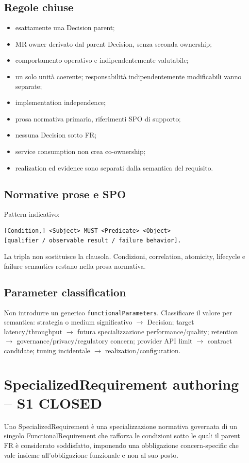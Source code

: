 \documentclass[11pt,a4paper]{article}
\begin{document}
\subsection{Regole chiuse}
\begin{itemize}
\item esattamente una Decision parent;
\item MR owner derivato dal parent Decision, senza seconda ownership;
\item comportamento operativo e indipendentemente valutabile;
\item un solo unità coerente; responsabilità indipendentemente modificabili vanno separate;
\item implementation independence;
\item prosa normativa primaria, riferimenti SPO di supporto;
\item nessuna Decision sotto FR;
\item service consumption non crea co-ownership;
\item realization ed evidence sono separati dalla semantica del requisito.
\end{itemize}

\subsection{Normative prose e SPO}
Pattern indicativo:
\begin{lstlisting}
[Condition,] <Subject> MUST <Predicate> <Object>
[qualifier / observable result / failure behavior].
\end{lstlisting}
La tripla non sostituisce la clausola. Condizioni, correlation, atomicity, lifecycle e failure semantics restano nella prosa normativa.

\subsection{Parameter classification}
Non introdurre un generico \texttt{functionalParameters}. Classificare il valore per semantica: strategia o medium significativo $\rightarrow$ Decision; target latency/throughput $\rightarrow$ futura specializzazione performance/quality; retention $\rightarrow$ governance/privacy/regulatory concern; provider API limit $\rightarrow$ contract candidate; tuning incidentale $\rightarrow$ realization/configuration.

\section{SpecializedRequirement authoring -- S1 CLOSED}
\begin{closedbox}
Uno SpecializedRequirement è una specializzazione normativa governata di un singolo FunctionalRequirement che rafforza le condizioni sotto le quali il parent FR è considerato soddisfatto, imponendo una obbligazione concern-specific che vale insieme all'obbligazione funzionale e non al suo posto.
\end{closedbox}
\end{document}
